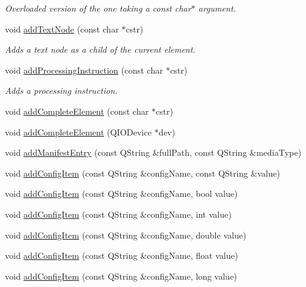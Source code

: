 \begin{DoxyCompactItemize}
\begin{DoxyCompactList}\small\item\em Overloaded version of the one taking a const char$\ast$ argument. \item\end{DoxyCompactList}\item 
void \hyperlink{classKoXmlWriter_a354008d8e086577751b2cbee5bf973f2}{addTextNode} (const char $\ast$cstr)
\begin{DoxyCompactList}\small\item\em Adds a text node as a child of the current element. \item\end{DoxyCompactList}\item 
void \hyperlink{classKoXmlWriter_aded4a15ee74b3dbd14cd0965d1ee471f}{addProcessingInstruction} (const char $\ast$cstr)
\begin{DoxyCompactList}\small\item\em Adds a processing instruction. \item\end{DoxyCompactList}\item 
void \hyperlink{classKoXmlWriter_acc98c1f1d995a792c7a0e4b2945954ff}{addCompleteElement} (const char $\ast$cstr)
\item 
void \hyperlink{classKoXmlWriter_a0bc25d326f56ee58c095d2e6287d6b7d}{addCompleteElement} (QIODevice $\ast$dev)
\item 
void \hyperlink{classKoXmlWriter_a168885626dde5e2432e9a2789b70715a}{addManifestEntry} (const QString \&fullPath, const QString \&mediaType)
\item 
void \hyperlink{classKoXmlWriter_aedfa20fc47c415db42871b8ff0d97e8d}{addConfigItem} (const QString \&configName, const QString \&value)
\item 
void \hyperlink{classKoXmlWriter_a2d1cc2de755ca456ca0f5bd8d81414ce}{addConfigItem} (const QString \&configName, bool value)
\item 
void \hyperlink{classKoXmlWriter_a14522a8ea1c3b25e299319653ba9af9e}{addConfigItem} (const QString \&configName, int value)
\item 
void \hyperlink{classKoXmlWriter_a3b08df454948731cdf29026298798540}{addConfigItem} (const QString \&configName, double value)
\item 
void \hyperlink{classKoXmlWriter_a3f5fa5e7f6283055cd09c94c8f67206f}{addConfigItem} (const QString \&configName, float value)
\item 
void \hyperlink{classKoXmlWriter_a96dd3ec071587e931296ce5e2b18c1e3}{addConfigItem} (const QString \&configName, long value)

\end{DoxyCompactItemize}
